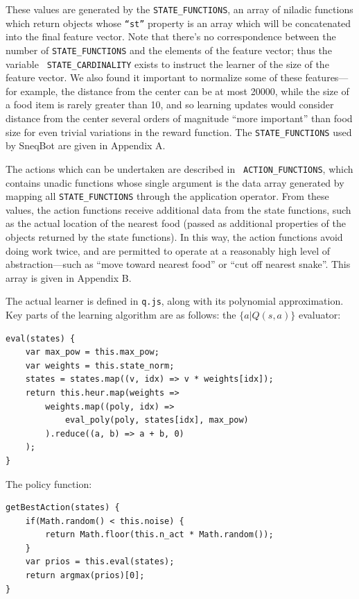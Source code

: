 \documentclass{article}
\begin{document}
	These values are generated by the {\tt STATE\_FUNCTIONS}, an array of
	niladic functions which return objects whose {\tt ``st''} property is an
	array which will be concatenated into the final feature vector. Note that
	there's no correspondence between the number of {\tt STATE\_FUNCTIONS} and
	the elements of the feature vector; thus the variable {\tt
	STATE\_CARDINALITY} exists to instruct the learner of the size of the
	feature vector. We also found it important to normalize some of these
	features---for example, the distance from the center can be at most 20000,
	while the size of a food item is rarely greater than 10, and so learning
	updates would consider distance from the center several orders of magnitude
	``more important'' than food size for even trivial variations in the reward
	function. The {\tt STATE\_FUNCTIONS} used by SneqBot are given in Appendix
	A.

	The actions which can be undertaken are described in {\tt
	ACTION\_FUNCTIONS}, which contains unadic functions whose single argument
	is the data array generated by mapping all {\tt STATE\_FUNCTIONS} through
	the application operator. From these values, the action functions receive
	additional data from the state functions, such as the actual location of
	the nearest food (passed as additional properties of the objects returned
	by the state functions). In this way, the action functions avoid doing work
	twice, and are permitted to operate at a reasonably high level of
	abstraction---such as ``move toward nearest food'' or ``cut off nearest
	snake''. This array is given in Appendix B.

	The actual learner is defined in {\tt q.js}, along with its polynomial
	approximation. Key parts of the learning algorithm are as follows: the $\{a
	| Q(s, a)\}$ evaluator:

	\begin{lstlisting}
eval(states) {
	var max_pow = this.max_pow;
	var weights = this.state_norm;
	states = states.map((v, idx) => v * weights[idx]);
	return this.heur.map(weights => 
		weights.map((poly, idx) =>
			eval_poly(poly, states[idx], max_pow)
		).reduce((a, b) => a + b, 0)
	);
}
	\end{lstlisting}

	The policy function:

	\begin{lstlisting}
getBestAction(states) {
	if(Math.random() < this.noise) {
		return Math.floor(this.n_act * Math.random());
	}
	var prios = this.eval(states);
	return argmax(prios)[0];
}
	\end{lstlisting}
\end{document}
